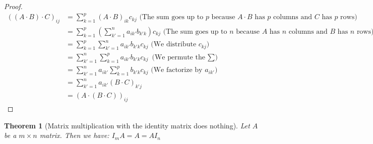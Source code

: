 \documentclass{article}
\newtheorem{theorem}{Theorem}[section]
\theoremstyle{definition}
\theoremstyle{remark}
\theoremstyle{example}
\newcommand{\lambdafunction}[2][1]{
		\let\tmp\relax
		\newcommand{\tmp}[#1]{#2}
		\tmp
}
\newcommand{\ffmatrix}[3]{
		\begin{bmatrix}
				\lambdafunction[2]{#1}{1}{1} & \lambdafunction[2]{#1}{1}{2} & \cdots & \lambdafunction[2]{#1}{1}{#3}\\
				\lambdafunction[2]{#1}{2}{1} & \lambdafunction[2]{#1}{2}{2} & \cdots & \lambdafunction[2]{#1}{2}{#3}\\
				\vdots & \vdots & \ddots & \vdots\\
				\lambdafunction[2]{#1}{#2}{1} & \lambdafunction[2]{#1}{#2}{2} & \cdots & \lambdafunction[2]{#1}{#2}{#3}\\
		\end{bmatrix}
}
\newcommand{\fmatrix}[3]{\begin{bmatrix} #1_{1 1} & #1_{1 2} & \cdots & #1_{1 #3} \\ #1_{2 1} & #1_{2 2} & \cdots & #1_{2 #3} \\ \vdots & \vdots & \ddots & \vdots \\ #1_{#2 1} & #1_{#2 2} & \cdots & #1_{#2 #3} \end{bmatrix}}
\begin{document}
\begin{proof}
		\begin{align*}
				((A \cdot B) \cdot C)_{ij} &= \sum_{k=1}^p (A \cdot B)_{ik} c_{kj} \text{ (The sum goes up to $p$ because $A \cdot B$ has $p$ columns and $C$ has $p$ rows)}\\
										   &= \sum_{k=1}^p (\sum_{k'=1}^n a_{ik'} b_{k'k}) c_{kj} \text{ (The sum goes up to $n$ because $A$ has $n$ columns and $B$ has $n$ rows)}\\
										   &= \sum_{k=1}^p \sum_{k'=1}^n a_{ik'} b_{k'k} c_{kj} \text{ (We distribute $c_{kj}$)}\\
										   &= \sum_{k'=1}^n \sum_{k=1}^p a_{ik'} b_{k'k} c_{kj} \text{ (We permute the $\sum$)}\\
										   &= \sum_{k'=1}^n a_{ik'} \sum_{k=1}^p b_{k'k} c_{kj} \text{ (We factorize by $a_{ik'}$)}\\
										   &= \sum_{k'=1}^n a_{ik'} (B \cdot C)_{k'j}\\
										   &= (A \cdot (B \cdot C))_{ij}
		\end{align*}
\end{proof}

\begin{theorem}[Matrix multiplication with the identity matrix does nothing] \label{thm:mult-nothing}
    Let $A$ be a $m \times n$ matrix. Then we have:
        $I_m A = A = A I_n$
\end{theorem}
\end{document}
